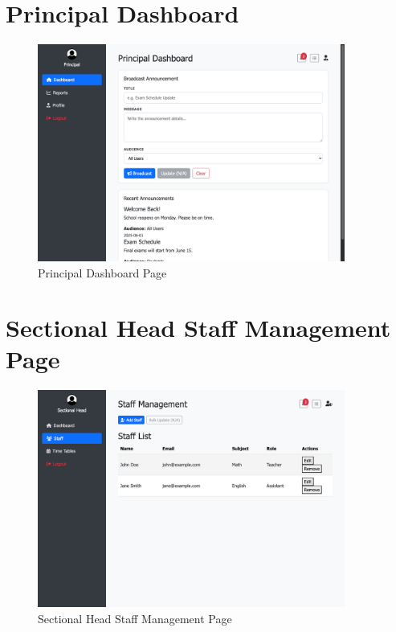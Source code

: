 \documentclass[12pt,a4paper]{report}
\begin{document}
\section{Principal Dashboard}
\begin{figure}[htbp]
    \centering
    \includegraphics[width=0.9\textwidth]{principal-dashboard-page.png}
    \caption{Principal Dashboard Page}
    \label{fig:principal-dashboard-page}
\end{figure}

\section{Sectional Head Staff Management Page}
\begin{figure}[htbp]
    \centering
    \includegraphics[width=0.9\textwidth]{sectionalhead-staff-management-page.png}
    \caption{Sectional Head Staff Management Page}
    \label{fig:sectionalhead-staff-management-page}
\end{figure}
\end{document}
